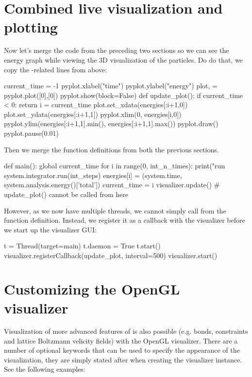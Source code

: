 \documentclass[
paper=a4,                       %
fontsize=11pt,                  %
twoside,                        %
footsepline,                    %
headsepline,                    %
headinclude=false,              %
footinclude=false,              %
pagesize,                       %
]{scrartcl}
\begin{document}
\section{Combined live visualization and plotting}

Now let's merge the code from the preceding two sections so we can see the energy graph while viewing the 3D visualization of the particles.
Do do that, we copy the -related lines from above:

\begin{pypresso}
current_time = -1
pyplot.xlabel("time")
pyplot.ylabel("energy")
plot, = pyplot.plot([0],[0])
pyplot.show(block=False)
def update_plot():
    if current_time < 0:
        return
    i = current_time
    plot.set_xdata(energies[:i+1,0])
    plot.set_ydata(energies[:i+1,1])
    pyplot.xlim(0, energies[i,0])
    pyplot.ylim(energies[:i+1,1].min(), energies[:i+1,1].max())
    pyplot.draw()
    pyplot.pause(0.01)
\end{pypresso}

Then we merge the  function definitions from both the previous sections.

\begin{pypresso}
def main():
    global current_time
    for i in range(0, int_n_times):
        print("run %
        system.integrator.run(int_steps)
        energies[i] = (system.time, system.analysis.energy()['total'])
        current_time = i
        visualizer.update()
        # update_plot() cannot be called from here
\end{pypresso}

However, as we now have multiple threads, we cannot simply call  from the  function definition.
Instead, we register it as a callback with the visualizer before we start up the visualizer GUI:

\begin{pypresso}
t = Thread(target=main)
t.daemon = True
t.start()
visualizer.registerCallback(update_plot, interval=500)
visualizer.start()
\end{pypresso}

\section{Customizing the OpenGL visualizer}

Visualization of more advanced features of \es is also possible (e.g.
bonds, constraints and lattice Boltzmann velicity fields) with the OpenGL
visualizer. There are a number of optional keywords that can be used to specify the
appearance of the visualization, they are simply stated after
 when creating the visualizer instance.
See the following examples:
\end{document}
